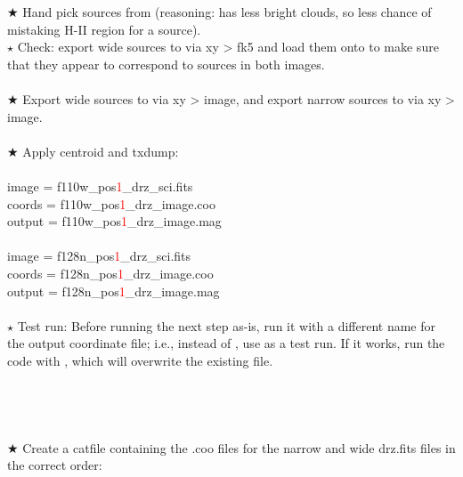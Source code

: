 \documentclass[11pt,obeyspaces]{article} %
\begin{document}
\begin{shaded}
$\bigstar$ Hand pick sources from \textcolor{red}{} (reasoning: has less bright clouds, so less chance of mistaking H-II region for a source). \\
$\star$ Check: export wide sources to \textcolor{red}{} via xy > fk5 and load them onto \textcolor{red}{} to make sure that they appear to correspond to sources in both images. \\ \\
$\bigstar$ Export wide sources to \textcolor{red}{} via xy > image, and export narrow sources to \textcolor{red}{} via xy > image. \\ \\
$\bigstar$ Apply centroid and txdump: \\
 \\
image = { f110w\_pos\textcolor{red}{1}\_drz\_sci.fits} \\ 
coords = {f110w\_pos\textcolor{red}{1}\_drz\_image.coo} \\
output = {f110w\_pos\textcolor{red}{1}\_drz\_image.mag} \\
 \\
image = { f128n\_pos\textcolor{red}{1}\_drz\_sci.fits} \\ 
coords = {f128n\_pos\textcolor{red}{1}\_drz\_image.coo} \\
output = {f128n\_pos\textcolor{red}{1}\_drz\_image.mag} \\ \\
$\star$ Test run: Before running the next step as-is, run it with a different name for the output coordinate file; i.e., instead of , use  as a test run. If it works, run the code with , which will overwrite the existing file. \\ \\
\textcolor{red}{}\textcolor{red}{} \\ 
\textcolor{red}{}\textcolor{red}{} \\ \\
$\bigstar$ Create a catfile containing the .coo files for the narrow and wide drz.fits files in the correct order:\\

\end{shaded}
\end{document}
